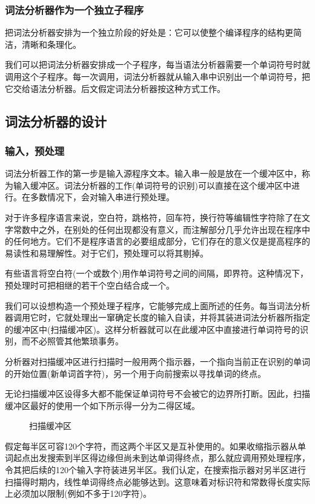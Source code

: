 \subsubsection{词法分析器作为一个独立子程序}

把词法分析器安排为一个独立阶段的好处是：它可以使整个编译程序的结构更简洁，清晰和条理化。

我们可以把词法分析器安排成一个子程序，每当语法分析器需要一个单词符号时就调用这个子程序。每一次调用，词法分析器就从输入串中识别出一个单词符号，把它交给语法分析器。后文假定词法分析器按这种方式工作。

\subsection{词法分析器的设计}
\subsubsection{输入，预处理}

词法分析器工作的第一步是输入源程序文本。输入串一般是放在一个缓冲区中，称为输入缓冲区。词法分析器的工作(单词符号的识别)可以直接在这个缓冲区中进行。在多数情况下，会对输入串进行预处理。

对于许多程序语言来说，空白符，跳格符，回车符，换行符等编辑性字符除了在文字常数中之外，在别处的任何出现都没有意义，而注解部分几乎允许出现在程序中的任何地方。它们不是程序语言的必要组成部分，它们存在的意义仅是提高程序的易读性和易理解性。对于它们，预处理可以将其剔掉。

有些语言将空白符(一个或数个)用作单词符号之间的间隔，即界符。这种情况下，预处理时可把相继的若干个空白结合成一个。

我们可以设想构造一个预处理子程序，它能够完成上面所述的任务。每当词法分析器调用它时，它就处理出一窜确定长度的输入自读，并将其装进词法分析器所指定的缓冲区中(扫描缓冲区)。这样分析器就可以在此缓冲区中直接进行单词符号的识别，而不必照管其他繁琐事务。

分析器对扫描缓冲区进行扫描时一般用两个指示器，一个指向当前正在识别的单词的开始位置(新单词首字符)，另一个用于向前搜索以寻找单词的终点。

无论扫描缓冲区设得多大都不能保证单词符号不会被它的边界所打断。因此，扫描缓冲区最好的使用一个如下所示得一分为二得区域。
\begin{figure}[H]
    \centering
    \caption{扫描缓冲区}
    \label{扫描缓冲区}
\end{figure}
假定每半区可容120个字符，而这两个半区又是互补使用的。如果收缩指示器从单词起点出发搜索到半区得边缘但尚未到达单词得终点，那么就应调用预处理程序，令其把后续的120个输入字符装进另半区。我们认定，在搜索指示器对另半区进行扫描得时期内，线性单词得终点必能够达到。这意味着对标识符和常数得长度实际上必须加以限制(例如不多于120字符)。

